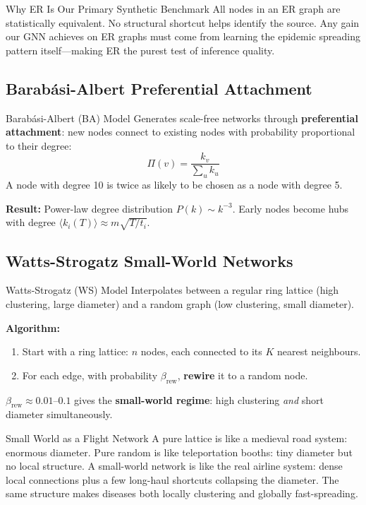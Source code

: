\begin{keyinsight}{Why ER Is Our Primary Synthetic Benchmark}
All nodes in an ER graph are statistically equivalent. No structural shortcut helps identify the source. Any gain our GNN achieves on ER graphs must come from learning the epidemic spreading pattern itself---making ER the purest test of inference quality.
\end{keyinsight}

\subsection{Barab\'{a}si-Albert Preferential Attachment}

\begin{conceptbox}{Barab\'{a}si-Albert (BA) Model}
Generates scale-free networks through \textbf{preferential attachment}: new nodes connect to existing nodes with probability proportional to their degree:
\[
\Pi(v) = \frac{k_v}{\sum_{u} k_u}
\]
A node with degree 10 is twice as likely to be chosen as a node with degree 5.

\textbf{Result:} Power-law degree distribution $P(k) \sim k^{-3}$. Early nodes become hubs with degree $\langle k_i(T) \rangle \approx m\sqrt{T/t_i}$.
\end{conceptbox}

\subsection{Watts-Strogatz Small-World Networks}

\begin{conceptbox}{Watts-Strogatz (WS) Model}
Interpolates between a regular ring lattice (high clustering, large diameter) and a random graph (low clustering, small diameter).

\textbf{Algorithm:}
\begin{enumerate}[noitemsep]
    \item Start with a ring lattice: $n$ nodes, each connected to its $K$ nearest neighbours.
    \item For each edge, with probability $\beta_\mathrm{rew}$, \textbf{rewire} it to a random node.
\end{enumerate}

$\beta_\mathrm{rew} \approx 0.01$--$0.1$ gives the \textbf{small-world regime}: high clustering \emph{and} short diameter simultaneously.
\end{conceptbox}

\begin{analogybox}{Small World as a Flight Network}
A pure lattice is like a medieval road system: enormous diameter. Pure random is like teleportation booths: tiny diameter but no local structure. A small-world network is like the real airline system: dense local connections plus a few long-haul shortcuts collapsing the diameter. The same structure makes diseases both locally clustering and globally fast-spreading.
\end{analogybox}

